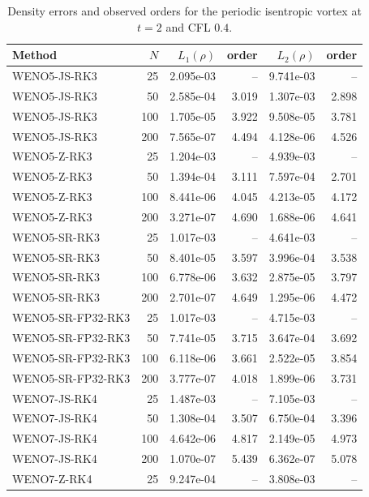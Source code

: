 \begin{table}[H]
\centering
\caption{Density errors and observed orders for the periodic isentropic vortex at $t=2$ and CFL $0.4$.}
\label{tab:vortex_convergence}
\scriptsize
\setlength{\tabcolsep}{3.7pt}
\renewcommand{\arraystretch}{0.90}
\begin{tabular}{lrrrrr}
\toprule
Method & $N$ & $L_1(\rho)$ & order & $L_2(\rho)$ & order \\
\midrule
WENO5-JS-RK3 & 25 & 2.095e-03 & -- & 9.741e-03 & -- \\
WENO5-JS-RK3 & 50 & 2.585e-04 & 3.019 & 1.307e-03 & 2.898 \\
WENO5-JS-RK3 & 100 & 1.705e-05 & 3.922 & 9.508e-05 & 3.781 \\
WENO5-JS-RK3 & 200 & 7.565e-07 & 4.494 & 4.128e-06 & 4.526 \\
\midrule
WENO5-Z-RK3 & 25 & 1.204e-03 & -- & 4.939e-03 & -- \\
WENO5-Z-RK3 & 50 & 1.394e-04 & 3.111 & 7.597e-04 & 2.701 \\
WENO5-Z-RK3 & 100 & 8.441e-06 & 4.045 & 4.213e-05 & 4.172 \\
WENO5-Z-RK3 & 200 & 3.271e-07 & 4.690 & 1.688e-06 & 4.641 \\
\midrule
WENO5-SR-RK3 & 25 & 1.017e-03 & -- & 4.641e-03 & -- \\
WENO5-SR-RK3 & 50 & 8.401e-05 & 3.597 & 3.996e-04 & 3.538 \\
WENO5-SR-RK3 & 100 & 6.778e-06 & 3.632 & 2.875e-05 & 3.797 \\
WENO5-SR-RK3 & 200 & 2.701e-07 & 4.649 & 1.295e-06 & 4.472 \\
\midrule
WENO5-SR-FP32-RK3 & 25 & 1.017e-03 & -- & 4.715e-03 & -- \\
WENO5-SR-FP32-RK3 & 50 & 7.741e-05 & 3.715 & 3.647e-04 & 3.692 \\
WENO5-SR-FP32-RK3 & 100 & 6.118e-06 & 3.661 & 2.522e-05 & 3.854 \\
WENO5-SR-FP32-RK3 & 200 & 3.777e-07 & 4.018 & 1.899e-06 & 3.731 \\
\midrule
WENO7-JS-RK4 & 25 & 1.487e-03 & -- & 7.105e-03 & -- \\
WENO7-JS-RK4 & 50 & 1.308e-04 & 3.507 & 6.750e-04 & 3.396 \\
WENO7-JS-RK4 & 100 & 4.642e-06 & 4.817 & 2.149e-05 & 4.973 \\
WENO7-JS-RK4 & 200 & 1.070e-07 & 5.439 & 6.362e-07 & 5.078 \\
\midrule
WENO7-Z-RK4 & 25 & 9.247e-04 & -- & 3.808e-03 & -- \\

\end{tabular}
\end{table}
